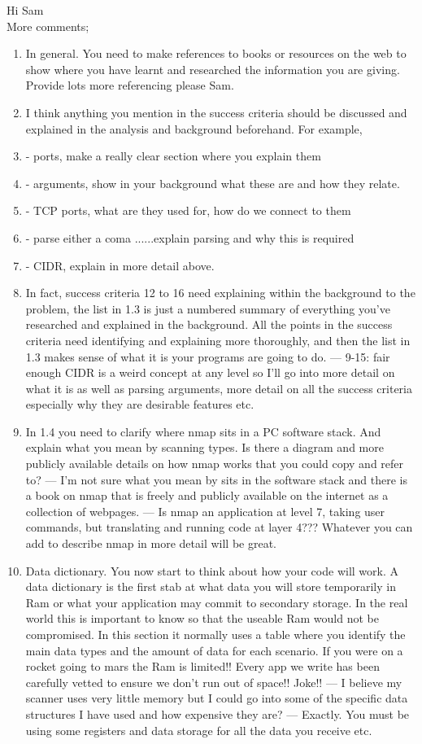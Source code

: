 \documentclass{article}
\begin{document}
Hi Sam \\

More comments;
\begin{enumerate}
  \item{In general. You need to make references to books or resources on the web to show where you have learnt and researched the information you are giving. Provide lots more referencing please Sam. }
  \item{I think anything you mention in the success criteria should be discussed and explained in the analysis and background beforehand. For example, }
  \item{- ports, make a really clear section where you explain them }
  \item{- arguments, show in your background what these are and how they relate. }
  \item{- TCP ports, what are they used for, how do we connect to them}
  \item{- parse either a coma ......explain parsing and why this is required}
  \item{- CIDR, explain in more detail above. }
  \item{In fact, success criteria 12 to 16 need explaining within the background to the problem, the list in 1.3 is just a numbered summary of everything you’ve researched and explained in the background. All the points in the success criteria need identifying and explaining more thoroughly, and then the list in 1.3 makes sense of what it is your programs are going to do. --- 9-15: fair enough CIDR is a weird concept at any level so I'll go into more detail on what it is as well as parsing arguments, more detail on all the success criteria especially why they are desirable features etc.}
  \item{In 1.4 you need to clarify where nmap sits in a PC software stack. And explain what you mean by scanning types. Is there a diagram and more publicly available details on how nmap works that you could copy and refer to? --- I'm not sure what you mean by sits in the software stack and there is a book on nmap that is freely and publicly available on the internet as a collection of webpages. --- Is nmap an application at level 7, taking user commands, but translating and running code at layer 4??? Whatever you can add to describe nmap in more detail will be great.}
  \item{Data dictionary. You now start to think about how your code will work. A data dictionary is the first stab at what data you will store temporarily in Ram or what your application may commit to secondary storage. In the real world this is important to know so that the useable Ram would not be  compromised.  In this section it normally uses a table where you identify the main data types and the amount of data for each scenario. If you were on a rocket going to mars the Ram is limited!! Every app we write has been carefully vetted to ensure we don’t run out of space!! Joke!! --- I believe my scanner uses very little memory but I could go into some of the specific data structures I have used and how expensive they are? --- Exactly. You must be using some registers and data storage for all the data you receive etc.}

\end{enumerate}
\end{document}
